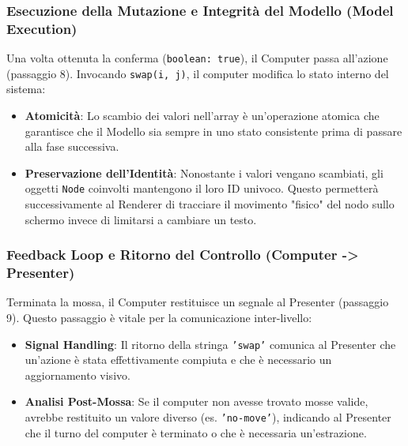 \documentclass[openany]{theme/uniprthesis}
\begin{document}
\subsubsection{Esecuzione della Mutazione e Integrità del Modello (Model Execution)}
Una volta ottenuta la conferma (\texttt{boolean: true}), il Computer passa all'azione (passaggio 8). Invocando \texttt{swap(i, j)}, il computer modifica lo stato interno del sistema:
\begin{itemize}
    \item \textbf{Atomicità}: Lo scambio dei valori nell'array è un'operazione atomica che garantisce che il Modello sia sempre in uno stato consistente prima di passare alla fase successiva.
    \item \textbf{Preservazione dell'Identità}: Nonostante i valori vengano scambiati, gli oggetti \texttt{Node} coinvolti mantengono il loro ID univoco. Questo permetterà successivamente al Renderer di tracciare il movimento "fisico" del nodo sullo schermo invece di limitarsi a cambiare un testo.
\end{itemize}

\subsubsection{Feedback Loop e Ritorno del Controllo (Computer -> Presenter)}
Terminata la mossa, il Computer restituisce un segnale al Presenter (passaggio 9). Questo passaggio è vitale per la comunicazione inter-livello:
\begin{itemize}
    \item \textbf{Signal Handling}: Il ritorno della stringa \texttt{'swap'} comunica al Presenter che un'azione è stata effettivamente compiuta e che è necessario un aggiornamento visivo.
    \item \textbf{Analisi Post-Mossa}: Se il computer non avesse trovato mosse valide, avrebbe restituito un valore diverso (es. \texttt{'no-move'}), indicando al Presenter che il turno del computer è terminato o che è necessaria un'estrazione.
\end{itemize}

\end{document}
